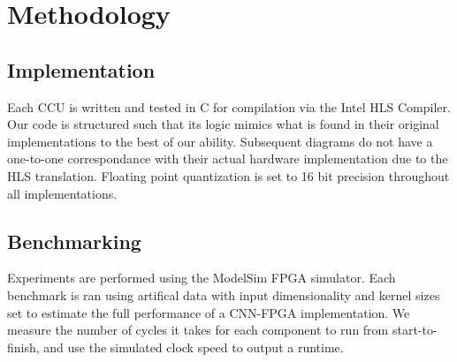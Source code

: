 \chapter{Methodology}
\section{Implementation}
Each CCU is written and tested in C for compilation via the Intel HLS Compiler. Our code is structured such that its logic mimics what is found in their original implementations to the best of our ability. Subsequent diagrams do not have a one-to-one correspondance with their actual hardware implementation due to the HLS translation. Floating point quantization is set to 16 bit precision throughout all implementations.
\section{Benchmarking}
Experiments are performed using the ModelSim FPGA simulator. Each benchmark is ran using artifical data with input dimensionality and kernel sizes set to estimate the full performance of a CNN-FPGA implementation. We measure the number of cycles it takes for each component to run from start-to-finish, and use the simulated clock speed to output a runtime.